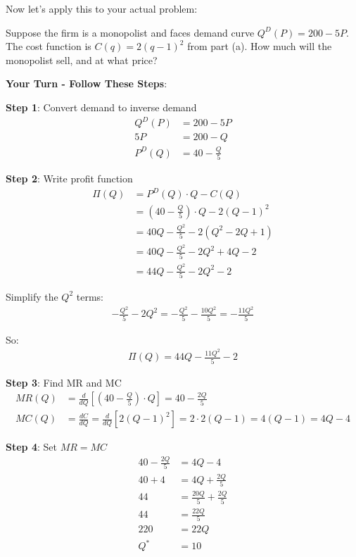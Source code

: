 \documentclass[12pt]{article}
\begin{document}
Now let's apply this to your actual problem:

\begin{tcolorbox}[colback=yellow!10, colframe=orange, title=\textbf{Problem 1B}]
Suppose the firm is a monopolist and faces demand curve $Q^D(P) = 200 - 5P$. The cost function is $C(q) = 2(q-1)^2$ from part (a). How much will the monopolist sell, and at what price?
\end{tcolorbox}

\vspace{0.3cm}

\textbf{Your Turn - Follow These Steps}:

\textbf{Step 1}: Convert demand to inverse demand
\begin{align*}
Q^D(P) &= 200 - 5P \\
5P &= 200 - Q \\
P^D(Q) &= 40 - \frac{Q}{5}
\end{align*}

\textbf{Step 2}: Write profit function
\begin{align*}
\Pi(Q) &= P^D(Q) \cdot Q - C(Q) \\
&= \left(40 - \frac{Q}{5}\right) \cdot Q - 2(Q-1)^2 \\
&= 40Q - \frac{Q^2}{5} - 2(Q^2 - 2Q + 1) \\
&= 40Q - \frac{Q^2}{5} - 2Q^2 + 4Q - 2 \\
&= 44Q - \frac{Q^2}{5} - 2Q^2 - 2
\end{align*}

Simplify the $Q^2$ terms:
\begin{align*}
-\frac{Q^2}{5} - 2Q^2 = -\frac{Q^2}{5} - \frac{10Q^2}{5} = -\frac{11Q^2}{5}
\end{align*}

So:
\begin{align*}
\Pi(Q) = 44Q - \frac{11Q^2}{5} - 2
\end{align*}

\textbf{Step 3}: Find MR and MC
\begin{align*}
MR(Q) &= \frac{d}{dQ}\left[\left(40 - \frac{Q}{5}\right) \cdot Q\right] = 40 - \frac{2Q}{5} \\
MC(Q) &= \frac{dC}{dQ} = \frac{d}{dQ}[2(Q-1)^2] = 2 \cdot 2(Q-1) = 4(Q-1) = 4Q - 4
\end{align*}

\newpage

\textbf{Step 4}: Set $MR = MC$
\begin{align*}
40 - \frac{2Q}{5} &= 4Q - 4 \\
40 + 4 &= 4Q + \frac{2Q}{5} \\
44 &= \frac{20Q}{5} + \frac{2Q}{5} \\
44 &= \frac{22Q}{5} \\
220 &= 22Q \\
Q^* &= 10
\end{align*}
\end{document}
